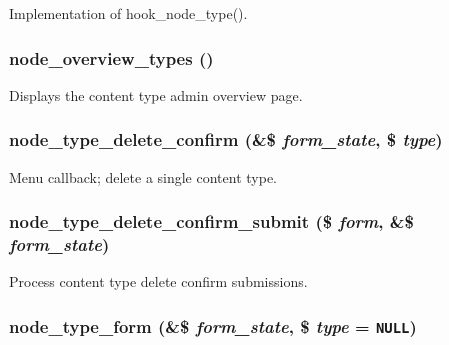 Implementation of hook\_\-node\_\-type(). \hypertarget{content__types_8inc_9530bf9d596b557e8c77f196960dde84}{
\subsubsection[{node\_\-overview\_\-types}]{\setlength{\rightskip}{0pt plus 5cm}node\_\-overview\_\-types ()}}
\label{content__types_8inc_9530bf9d596b557e8c77f196960dde84}


Displays the content type admin overview page. \hypertarget{content__types_8inc_c6ec6d24eccef00581a060b9081a7e1d}{
\subsubsection[{node\_\-type\_\-delete\_\-confirm}]{\setlength{\rightskip}{0pt plus 5cm}node\_\-type\_\-delete\_\-confirm (\&\$ {\em form\_\-state}, \/  \$ {\em type})}}
\label{content__types_8inc_c6ec6d24eccef00581a060b9081a7e1d}


Menu callback; delete a single content type. \hypertarget{content__types_8inc_ef7aa2855944bc4869a9956736b2845a}{
\subsubsection[{node\_\-type\_\-delete\_\-confirm\_\-submit}]{\setlength{\rightskip}{0pt plus 5cm}node\_\-type\_\-delete\_\-confirm\_\-submit (\$ {\em form}, \/  \&\$ {\em form\_\-state})}}
\label{content__types_8inc_ef7aa2855944bc4869a9956736b2845a}


Process content type delete confirm submissions. \hypertarget{content__types_8inc_29b6f02d1269c1f1f0e8d6d0e18f9b96}{
\subsubsection[{node\_\-type\_\-form}]{\setlength{\rightskip}{0pt plus 5cm}node\_\-type\_\-form (\&\$ {\em form\_\-state}, \/  \$ {\em type} = {\tt NULL})}}
\label{content__types_8inc_29b6f02d1269c1f1f0e8d6d0e18f9b96}



